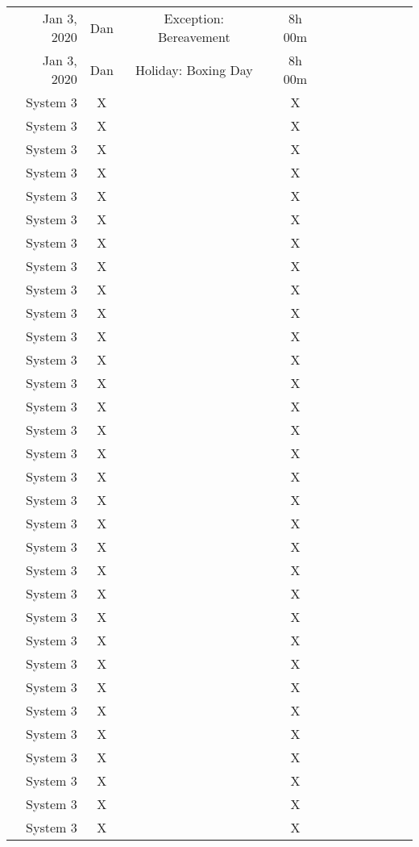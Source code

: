 \documentclass[12pt, letterpaper, twoside]{article}
\begin{document}
\begin{table}
\begin{tabular}{rcccc:c:c:c:c:c:c}
			Jan 3, 2020 & Dan & Exception: Bereavement & 8h 00m &&&&&&& \\
			Jan 3, 2020 & Dan & Holiday: Boxing Day & 8h 00m &&&&&&& \\
			System 3 & X &    & X & &&&&&& \\
			System 3 & X &    & X & &&&&&& \\
			System 3 & X &    & X & &&&&&& \\
			System 3 & X &    & X & &&&&&& \\
			System 3 & X &    & X & &&&&&& \\
			System 3 & X &    & X & &&&&&& \\
			System 3 & X &    & X & &&&&&& \\
			System 3 & X &    & X & &&&&&& \\
			System 3 & X &    & X & &&&&&& \\
			System 3 & X &    & X & &&&&&& \\
			System 3 & X &    & X & &&&&&& \\
			System 3 & X &    & X & &&&&&& \\
			System 3 & X &    & X & &&&&&& \\
			System 3 & X &    & X & &&&&&& \\
			System 3 & X &    & X & &&&&&& \\
			System 3 & X &    & X & &&&&&& \\
			System 3 & X &    & X & &&&&&& \\
			System 3 & X &    & X & &&&&&& \\
			System 3 & X &    & X & &&&&&& \\
			System 3 & X &    & X & &&&&&& \\
			System 3 & X &    & X & &&&&&& \\
			System 3 & X &    & X & &&&&&& \\
			System 3 & X &    & X & &&&&&& \\
			System 3 & X &    & X & &&&&&& \\
			System 3 & X &    & X & &&&&&& \\
			System 3 & X &    & X & &&&&&& \\
			System 3 & X &    & X & &&&&&& \\
			System 3 & X &    & X & &&&&&& \\
			System 3 & X &    & X & &&&&&& \\
			System 3 & X &    & X & &&&&&& \\
			System 3 & X &    & X & &&&&&& \\
			System 3 & X &    & X & &&&&&& \\

\end{tabular}
\end{table}
\end{document}
